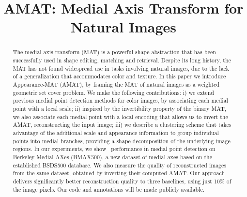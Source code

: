 \documentclass[10pt,twocolumn,letterpaper]{article}
\begin{document}
\title{AMAT: Medial Axis Transform for Natural Images}
\maketitle


\begin{abstract}
The medial axis transform (MAT) is a powerful shape abstraction that has been successfully
used in shape editing, matching and retrieval. 
Despite its long history, the MAT has not found widespread use in tasks 
involving natural images, due to the lack of a generalization that accommodates color and texture.
In this paper we introduce Appearance-MAT (AMAT), by framing the MAT 
of natural images as a weighted geometric set cover problem.
We make the following contributions: 
i) we extend previous medial point detection methods for color images,
by associating each medial point with a local scale; 
ii) inspired by the invertibility property of the binary MAT, we also associate each medial point with a local encoding
that allows us to invert the AMAT, reconstructing the input image; 
iii) we describe a clustering scheme that takes advantage of the additional scale and appearance information 
to group individual points into medial branches, providing a shape decomposition of the underlying image regions.
In our experiments, we show \sota\ performance in medial point detection on
Berkeley Medial AXes (BMAX500), a new dataset of medial axes based on the established BSDS500 database.
We also measure the quality of reconstructed images from the same dataset,
obtained by inverting their computed AMAT.
Our approach delivers significantly better reconstruction quality \wrt to three baselines,
using just 10\% of the image pixels. 
Our code and annotations will be made publicly available.
\end{abstract}


\end{document}
